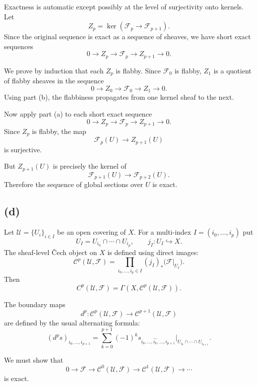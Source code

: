 Exactness is automatic except possibly at the level of surjectivity onto
kernels. Let
\[
Z_p=\ker(\mathcal F_p\to \mathcal F_{p+1}).
\]
Since the original sequence is exact as a sequence of sheaves, we have short
exact sequences
\[
0\longrightarrow Z_p
\longrightarrow \mathcal F_p
\longrightarrow Z_{p+1}
\longrightarrow 0.
\]

We prove by induction that each $Z_p$ is flabby. Since $\mathcal F_0$ is
flabby, $Z_1$ is a quotient of flabby sheaves in the sequence
\[
0\longrightarrow Z_0
\longrightarrow \mathcal F_0
\longrightarrow Z_1
\longrightarrow 0.
\]
Using part (b), the flabbiness propagates from one kernel sheaf to the next.

Now apply part (a) to each short exact sequence
\[
0\longrightarrow Z_p
\longrightarrow \mathcal F_p
\longrightarrow Z_{p+1}
\longrightarrow 0.
\]
Since $Z_p$ is flabby, the map
\[
\mathcal F_p(U)\longrightarrow Z_{p+1}(U)
\]
is surjective.

But $Z_{p+1}(U)$ is precisely the kernel of
\[
\mathcal F_{p+1}(U)\longrightarrow \mathcal F_{p+2}(U).
\]
Therefore the sequence of global sections over $U$ is exact.

\subsection*{(d)}

Let $\mathcal U=\{U_i\}_{i\in I}$ be an open covering of $X$.
For a multi-index $I=(i_0,\ldots,i_p)$ put
\[
U_I=U_{i_0}\cap\cdots\cap U_{i_p},
\qquad j_I:U_I\hookrightarrow X.
\]
The sheaf-level \v{C}ech object on $X$ is defined using direct images:
\[
\mathcal C^p(\mathcal U,\mathcal F)
=
\prod_{i_0,\ldots,i_p\in I}
(j_I)_*\bigl(\mathcal F|_{U_I}\bigr).
\]
Then
\[
C^p(\mathcal U,\mathcal F)
=
\Gamma(X,\mathcal C^p(\mathcal U,\mathcal F)).
\]

The boundary maps
\[
d^p:\mathcal C^p(\mathcal U,\mathcal F)
\longrightarrow
\mathcal C^{p+1}(\mathcal U,\mathcal F)
\]
are defined by the usual alternating formula:
\[
(d^p s)_{i_0,\ldots,i_{p+1}}
=
\sum_{k=0}^{p+1}
(-1)^k
s_{i_0,\ldots,\widehat{i_k},\ldots,i_{p+1}}
\big|_{U_{i_0}\cap\cdots\cap U_{i_{p+1}}}.
\]

We must show that
\[
0\longrightarrow \mathcal F
\longrightarrow
\mathcal C^0(\mathcal U,\mathcal F)
\longrightarrow
\mathcal C^1(\mathcal U,\mathcal F)
\longrightarrow
\cdots
\]
is exact.

